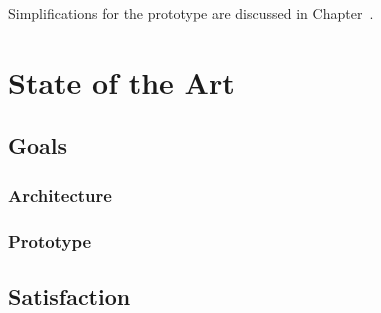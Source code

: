 Simplifications for the prototype are discussed in Chapter~.

\section{State of the Art}

\subsection{Goals}

\subsubsection{Architecture}

\subsubsection{Prototype}



\subsection{Satisfaction}
